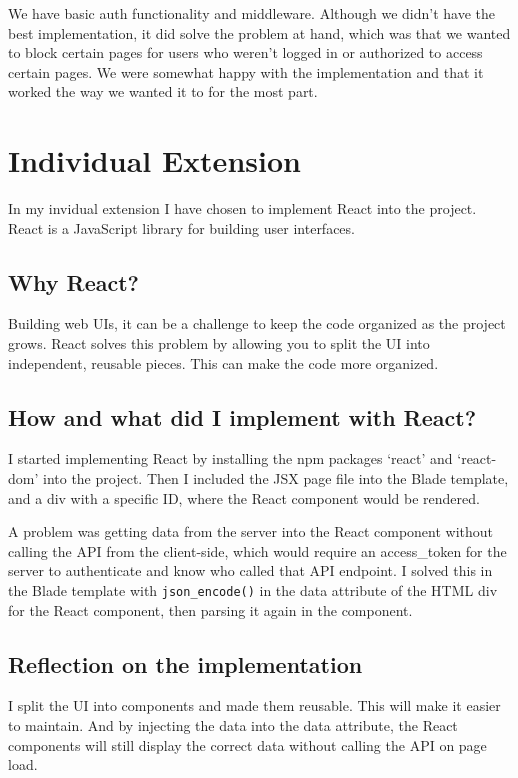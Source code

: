 \documentclass[letterpaper,twocolumn]{article}
\begin{document}
We have basic auth functionality and middleware.
Although we didn't have the best implementation, it did solve the problem at hand, which was that we wanted to block certain pages for users who weren't logged in or authorized to access certain pages.
We were somewhat happy with the implementation and that it worked the way we wanted it to for the most part.


\section{Individual Extension}

In my invidual extension I have chosen to implement React into the project.
React is a JavaScript library for building user interfaces.

\subsection{Why React?}

Building web UIs, it can be a challenge to keep the code organized as the project grows.
React solves this problem by allowing you to split the UI into independent, reusable pieces.
This can make the code more organized.

\subsection{How and what did I implement with React?}

I started implementing React by installing the npm packages `react' and `react-dom' into the project.
Then I included the JSX page file into the Blade template, and a div with a specific ID, where the React component would be rendered.

A problem was getting data from the server into the React component without calling the API from the client-side, which would require an access\_token for the server to authenticate and know who called that API endpoint.
I solved this in the Blade template with \texttt{json_encode()} in the data attribute of the HTML div for the React component, then parsing it again in the component.

\subsection{Reflection on the implementation}

I split the UI into components and made them reusable.
This will make it easier to maintain.
And by injecting the data into the data attribute,
the React components will still display the correct data without calling the API on page load.
\end{document}
